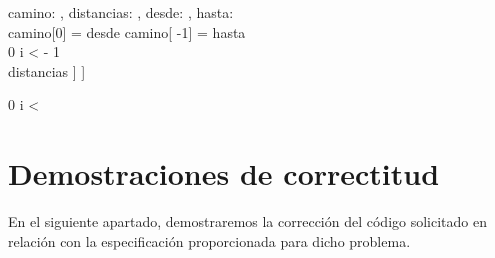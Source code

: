 \documentclass[10pt,a4paper]{article}
\newcommand{\matrizEnt}{\TLista{\TLista{\ent}}}
\begin{document}
{camino: \TLista{\ent}, distancias: \matrizEnt, desde: \ent, hasta: \ent}
{
  \yLuego \\
camino[0] = desde \land  camino[ -1] = hasta \land \\
 {\ent} { 0 \leq i <  - 1 \\  	\implicaLuego distancias \; [\;camino[i]\;] \; [\;camino[i+1]\;] }
}

{
	0 \leq i < 
}





\section{Demostraciones de correctitud}

En el siguiente apartado, demostraremos la corrección del código solicitado  en relación con la especificación proporcionada para dicho problema.  
\end{document}
